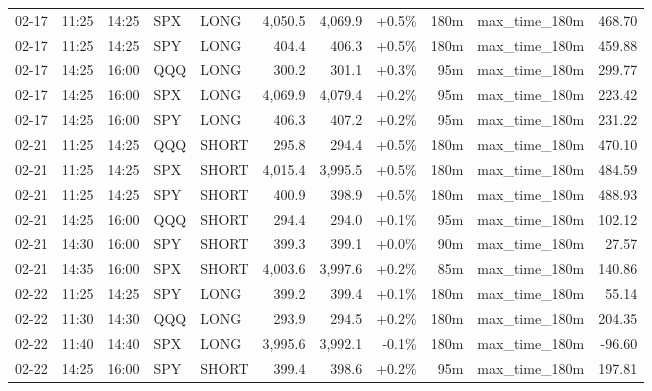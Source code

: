\documentclass[11pt,a4paper,twoside]{article}
\begin{document}
\begin{center}
\begin{longtable}{>{\color{txtmain}}l l l l l r r r r >{\color{txtmain}}l r}
02-17 & 11:25 & 14:25 & SPX & LONG & 4,050.5 & 4,069.9 & \textcolor{wingreen}{+0.5\%} & 180m & max\_time\_180m & \textcolor{wingreen}{468.70} \\
02-17 & 11:25 & 14:25 & SPY & LONG & 404.4 & 406.3 & \textcolor{wingreen}{+0.5\%} & 180m & max\_time\_180m & \textcolor{wingreen}{459.88} \\
02-17 & 14:25 & 16:00 & QQQ & LONG & 300.2 & 301.1 & \textcolor{wingreen}{+0.3\%} & 95m & max\_time\_180m & \textcolor{wingreen}{299.77} \\
02-17 & 14:25 & 16:00 & SPX & LONG & 4,069.9 & 4,079.4 & \textcolor{wingreen}{+0.2\%} & 95m & max\_time\_180m & \textcolor{wingreen}{223.42} \\
02-17 & 14:25 & 16:00 & SPY & LONG & 406.3 & 407.2 & \textcolor{wingreen}{+0.2\%} & 95m & max\_time\_180m & \textcolor{wingreen}{231.22} \\
02-21 & 11:25 & 14:25 & QQQ & SHORT & 295.8 & 294.4 & \textcolor{wingreen}{+0.5\%} & 180m & max\_time\_180m & \textcolor{wingreen}{470.10} \\
02-21 & 11:25 & 14:25 & SPX & SHORT & 4,015.4 & 3,995.5 & \textcolor{wingreen}{+0.5\%} & 180m & max\_time\_180m & \textcolor{wingreen}{484.59} \\
02-21 & 11:25 & 14:25 & SPY & SHORT & 400.9 & 398.9 & \textcolor{wingreen}{+0.5\%} & 180m & max\_time\_180m & \textcolor{wingreen}{488.93} \\
02-21 & 14:25 & 16:00 & QQQ & SHORT & 294.4 & 294.0 & \textcolor{wingreen}{+0.1\%} & 95m & max\_time\_180m & \textcolor{wingreen}{102.12} \\
02-21 & 14:30 & 16:00 & SPY & SHORT & 399.3 & 399.1 & \textcolor{wingreen}{+0.0\%} & 90m & max\_time\_180m & \textcolor{wingreen}{27.57} \\
02-21 & 14:35 & 16:00 & SPX & SHORT & 4,003.6 & 3,997.6 & \textcolor{wingreen}{+0.2\%} & 85m & max\_time\_180m & \textcolor{wingreen}{140.86} \\
02-22 & 11:25 & 14:25 & SPY & LONG & 399.2 & 399.4 & \textcolor{wingreen}{+0.1\%} & 180m & max\_time\_180m & \textcolor{wingreen}{55.14} \\
02-22 & 11:30 & 14:30 & QQQ & LONG & 293.9 & 294.5 & \textcolor{wingreen}{+0.2\%} & 180m & max\_time\_180m & \textcolor{wingreen}{204.35} \\
02-22 & 11:40 & 14:40 & SPX & LONG & 3,995.6 & 3,992.1 & \textcolor{lossred}{-0.1\%} & 180m & max\_time\_180m & \textcolor{lossred}{-96.60} \\
02-22 & 14:25 & 16:00 & SPY & SHORT & 399.4 & 398.6 & \textcolor{wingreen}{+0.2\%} & 95m & max\_time\_180m & \textcolor{wingreen}{197.81} \\

\end{longtable}
\end{center}
\end{document}
